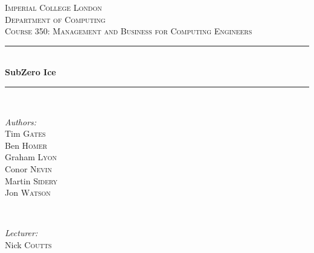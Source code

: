 \documentclass{article}
\begin{document}

\begin{titlepage}
\newcommand{\HRule}{\rule{\linewidth}{0.5mm}}
\center
\textsc{\LARGE Imperial College London}  \\[1.5cm]
\textsc{\Large Department of Computing}  \\[0.5cm]
\textsc{\large Course 350: Management and Business for Computing Engineers} \\[0.5cm]

\HRule \\[0.6cm]
{\huge \bfseries SubZero Ice} \\[0.3cm]
\HRule \\[1.5cm]

\begin{minipage}{0.4\textwidth}

\begin{flushleft} \large \emph{Authors:} \\
Tim       \textsc{Gates}   \\
Ben       \textsc{Homer}    \\
Graham     \textsc{Lyon}    \\
Conor      \textsc{Nevin}    \\
Martin     \textsc{Sidery}    \\
Jon        \textsc{Watson}    \\
\end{flushleft}

\end{minipage}~
\begin{minipage}{0.4\textwidth}

\begin{flushright} \large \emph{Lecturer:} \\
Nick \textsc{Coutts}
\end{flushright}

\end{minipage}\\[4cm]


\end{titlepage}
\end{document}
